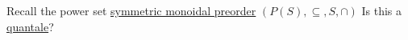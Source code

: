 Recall the power set \hyperref[D2.2]{symmetric monoidal preorder} $(P(S),\subseteq, S, \cap)$ Is this a \hyperref[D2.90]{quantale}?